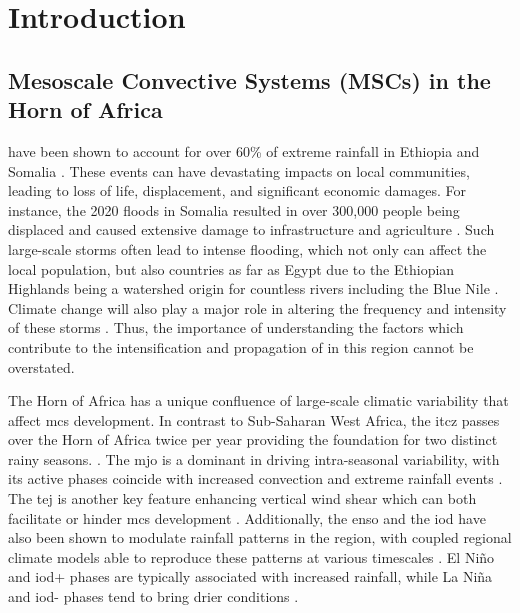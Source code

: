 \chapter{Introduction}
\label{ch:intro}

\section{Mesoscale Convective Systems (MSCs) in the Horn of Africa}

 have been shown to account for over 60\% of extreme rainfall in Ethiopia and Somalia \citep{Hill2023}. These events can have devastating impacts on local communities, leading to loss of life, displacement, and significant economic damages. For instance, the 2020 floods in Somalia resulted in over 300,000 people being displaced and caused extensive damage to infrastructure and agriculture . Such large-scale storms often lead to intense flooding, which not only can affect the local population, but also countries as far as Egypt due to the Ethiopian Highlands being a watershed origin for countless rivers including the Blue Nile \citep{Legese2020,Zaroug2014}. Climate change will also play a major role in altering the frequency and intensity of these storms \citep{Endris2019,Das2016}. Thus, the importance of understanding the factors which contribute to the intensification and propagation of  in this region cannot be overstated.

The Horn of Africa has a unique confluence of large-scale climatic variability that affect \acrshort{mcs} development. In contrast to Sub-Saharan West Africa, the \acrfull{itcz} passes over the Horn of Africa twice per year providing the foundation for two distinct rainy seasons. \citep{Palmer2023,Tefera2025}. The \acrfull{mjo} is a dominant in driving intra-seasonal variability, with its active phases coincide with increased convection and extreme rainfall events \citep{Camberlin2019,Ochieng2023,Pohl2006}. The \acrfull{tej} is another key feature enhancing vertical wind shear which can both facilitate or hinder \acrshort{mcs} development \citep{Farnsworth2011,Vashisht2021}. Additionally, the \acrfull{enso} and the \acrfull{iod} have also been shown to modulate rainfall patterns in the region, with coupled regional climate models able to reproduce these patterns at various timescales \citep{Dubache2019,Endris2019,Vashisht2021,Zaroug2014}. El Niño and \acrshort{iod}+ phases are typically associated with increased rainfall, while La Niña and \acrshort{iod}- phases tend to bring drier conditions \citep{Camberlin2019,Endris2019}.


